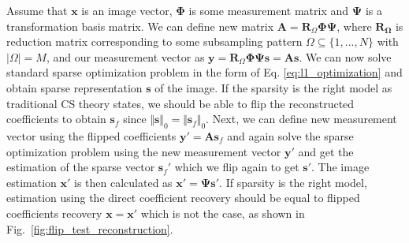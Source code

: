 \documentclass[journal]{IEEEtran}
\begin{document}
Assume that $\boldsymbol{x}$ is an image vector, $\boldsymbol{\Phi}$ is some measurement matrix and $\boldsymbol{\Psi}$ is a transformation basis matrix. We can define new matrix $\boldsymbol{A}=\boldsymbol{R}_\Omega \boldsymbol{\Phi}\boldsymbol{\Psi}$, where $\boldsymbol{R_\Omega}$ is reduction matrix corresponding to some subsampling pattern $\Omega \subseteq \{1,...,N\}$ with $\vert \Omega\vert = M$, and our measurement vector as $\boldsymbol{y}=\boldsymbol{R}_\Omega\boldsymbol{\Phi}\boldsymbol{\Psi}\boldsymbol{s}=\boldsymbol{A}\boldsymbol{s}$. We can now solve standard sparse optimization problem in the form of Eq. \ref{eq:l1_optimization} and obtain sparse representation $\boldsymbol{s}$ of the image. If the sparsity is the right model as traditional CS theory states, we should be able to flip the reconstructed coefficients to obtain $\boldsymbol{s}_f$ since $\Vert\boldsymbol{s}\Vert_0=\Vert\boldsymbol{s}_f\Vert_0$. Next, we can define new measurement vector using the flipped coefficients $\boldsymbol{{y'}}=\boldsymbol{A}\boldsymbol{s}_f$ and again solve the sparse optimization problem using the new measurement vector $\boldsymbol{{y'}}$ and get the estimation of the sparse vector $\boldsymbol{s}_{f}'$ which we flip again to get $\boldsymbol{{s'}}$. The image estimation $\boldsymbol{{x'}}$ is then calculated as $\boldsymbol{{x}'}=\boldsymbol{\Psi}\boldsymbol{{s'}}$. If sparsity is the right model, estimation using the direct coefficient recovery should be equal to flipped coefficients recovery $\boldsymbol{{x}=\boldsymbol{x'}}$ which is not the case, as shown in Fig.~\ref{fig:flip_test_reconstruction}. 
\end{document}
